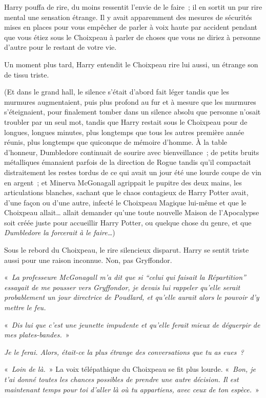 Harry pouffa de rire, du moins ressentit l'envie de le faire~;
il en sortit un pur rire mental une sensation étrange.
Il y avait apparemment des mesures de sécurités mises en places pour vous empêcher de parler à voix haute par accident pendant que vous étiez sous le Choixpeau à parler de choses que vous ne diriez à personne d'autre pour le restant de votre vie.

Un moment plus tard, Harry entendit le Choixpeau rire lui aussi, un étrange son de tissu triste.

(Et dans le grand hall, le silence s'était d'abord fait léger tandis que les murmures augmentaient, puis plus profond au fur et à mesure que les murmures s'éteignaient, pour finalement tomber dans un silence absolu que personne n'osait troubler par un seul mot, tandis que Harry restait sous le Choixpeau pour de longues, longues minutes, plus longtemps que tous les autres première année réunis, plus longtemps que quiconque de mémoire d'homme.
À la table d'honneur, Dumbledore continuait de sourire avec bienveillance~; de petits bruits métalliques émanaient parfois de la direction de Rogue tandis qu'il compactait distraitement les restes tordus de ce qui avait un jour été une lourde coupe de vin en argent~;
et Minerva McGonagall agrippait le pupitre des deux mains, les articulations blanches, sachant que le chaos contagieux de Harry Potter avait, d'une façon ou d'une autre, infecté le Choixpeau Magique lui-même et que le Choixpeau allait… allait demander qu'une toute nouvelle Maison de l'Apocalypse soit créée juste pour accueillir Harry Potter, ou quelque chose du genre, et que \emph{Dumbledore la forcerait à le faire…})

Sous le rebord du Choixpeau, le rire silencieux disparut.
Harry se sentit triste aussi pour une raison inconnue.
Non, pas Gryffondor.

«~\emph{La professeure McGonagall m'a dit que si “celui qui faisait la Répartition” essayait de me pousser vers Gryffondor, je devais lui rappeler qu'elle serait probablement un jour directrice de Poudlard, et qu'elle aurait alors le pouvoir d'y mettre le feu.}

«~\emph{Dis lui que c'est une jeunette impudente et qu'elle ferait mieux de déguerpir de mes plates-bandes.}~»

\emph{Je le ferai. Alors, était-ce la plus étrange des conversations que tu as eues~?}

«~\emph{Loin de là.}~» La voix télépathique du Choixpeau se fit plus lourde.
«~\emph{Bon, je t'ai donné toutes les chances possibles de prendre une autre décision.
Il est maintenant temps pour toi d'aller là où tu appartiens, avec ceux de ton espèce.}~»

